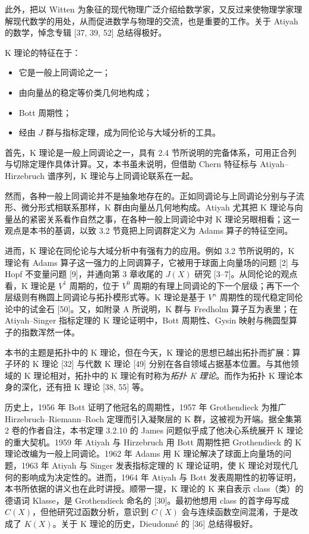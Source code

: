 此外，把以 Witten 为象征的现代物理广泛介绍给数学家，又反过来使物理学家理解现代数学的用处，从而促进数学与物理的交流，也是重要的工作。关于 Atiyah 的数学，悼念专辑 [37, 39, 52] 总结得极好。


K 理论的特征在于：

\begin{itemize}[leftmargin=2em,itemsep=2pt]
\item 它是一般上同调论之一；
\item 由向量丛的稳定等价类几何地构成；
\item Bott 周期性；
\item 经由 $J$ 群与指标定理，成为同伦论与大域分析的工具。
\end{itemize}

首先，K 理论是一般上同调论之一，具有 2.4 节所说明的完备体系，可用正合列与切除定理作具体计算。又，本书虽未说明，但借助 Chern 特征标与 Atiyah--Hirzebruch 谱序列，K 理论与上同调论联系在一起。

然而，各种一般上同调论并不是抽象地存在的。正如同调论与上同调论分别与子流形、微分形式相联系那样，K 群由向量丛几何地构成。Atiyah 尤其把 K 理论与向量丛的紧密关系看作自然之事，在各种一般上同调论中对 K 理论另眼相看；这一观点是本书的基调，以致 3.2 节竟把上同调群定义为 Adams 算子的特征空间。

进而，K 理论在同伦论与大域分析中有强有力的应用。例如 3.2 节所说明的，K 理论有 Adams 算子这一强力的上同调算子，它被用于球面上向量场的问题 [2] 与 Hopf 不变量问题 [9]，并通向第 3 章收尾的 $J(X)$ 研究 [3--7]。从同伦论的观点看，K 理论是 $V^{1}$ 周期的，位于 $V^{0}$ 周期的有理上同调论的下一个层级；再下一个层级则有椭圆上同调论与拓扑模形式等。K 理论是基于 $V^{n}$ 周期性的现代稳定同伦论中的试金石 [50]。又，如附录 A 所说明，K 群与 Fredholm 算子互为表里；在 Atiyah--Singer 指标定理的 K 理论证明中，Bott 周期性、Gysin 映射与椭圆型算子的指数浑然一体。

本书的主题是拓扑中的 K 理论，但在今天，K 理论的思想已越出拓扑而扩展：算子环的 K 理论 [32] 与代数 K 理论 [49] 分别在各自领域占据基本位置。与其他领域的 K 理论相对，拓扑中的 K 理论有时称为\emph{拓扑 K 理论}。而作为拓扑 K 理论本身的深化，还有扭 K 理论 [38, 55] 等。

历史上，1956 年 Bott 证明了他冠名的周期性，1957 年 Grothendieck 为推广 Hirzebruch--Riemann--Roch 定理而引入凝聚层的 K 群，这被视为开端。据全集第 2 卷的作者自注，本书定理 3.2.10 的 James 问题似乎成了他决心系统展开 K 理论的重大契机。1959 年 Atiyah 与 Hirzebruch 用 Bott 周期性把 Grothendieck 的 K 理论改编为一般上同调论。1962 年 Adams 用 K 理论解决了球面上向量场的问题，1963 年 Atiyah 与 Singer 发表指标定理的 K 理论证明，使 K 理论对现代几何的影响成为决定性的。进而，1964 年 Atiyah 与 Bott 发表周期性的初等证明，本书所依据的讲义也在此时讲授。顺带一提，K 理论的 K 来自表示 class（类）的德语词 Klasse，是 Grothendieck 命名的 [30]。最初他想用 class 的首字母写成 $C(X)$，但他研究过函数分析，意识到 $C(X)$ 会与连续函数空间混淆，于是改成了 $K(X)$。关于 K 理论的历史，Dieudonné 的 [36] 总结得极好。


